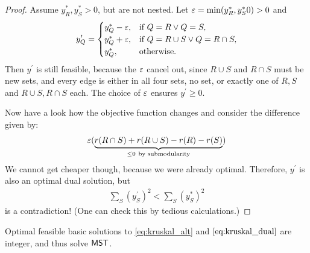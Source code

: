 \begin{proof}
    Assume $y_R^*, y_S^* > 0$, but are not nested.
    Let $\varepsilon = \min(y_R^*,y_S^*0) >0$ and
    \begin{align*}
        y_Q^\prime = \begin{cases}
                         y_Q^*- \varepsilon, & \text{if } Q= R \vee Q=S,               \\
                         y_Q^*+ \varepsilon, & \text{if } Q= R \cup S \vee Q=R \cap S, \\
                         y_Q^*,       & \text{otherwise}.                      \\
                     \end{cases}
    \end{align*}
    Then $y^\prime$ is still feasible, because the $\varepsilon$ cancel out, since $R \cup S$ and $R \cap S$ must be new sets,
    and every edge is either in all four sets, no set, or exactly one of $R,S$ and $R\cup S,R\cap S$ each.
    The choice of $\varepsilon$ ensures $y^\prime \geq 0$.

    Now have a look how the objective function changes and consider the difference given by:
    \begin{align*}
        \varepsilon (\underbrace{r(R \cap S) + r(R \cup S) - r(R) - r(S)}_{\leq 0\ \text{by submodularity}})
    \end{align*}
    We cannot get cheaper though, because we were already optimal. Therefore,  $y^\prime$ is also an optimal dual solution, but
    \begin{align*}
        \sum_S(y_S^\prime)^2 < \sum_S(y^*_S)^2
    \end{align*}
    is a contradiction! (One can check this by tedious calculations.)
\end{proof}
\begin{theorem} \label{thm:integer-mst-submod}
    Optimal feasible basic solutions to \eqref{eq:kruskal_alt} and $\eqref{eq:kruskal_dual}$
    are integer, and thus solve $\mathsf{MST}$.
\end{theorem}
